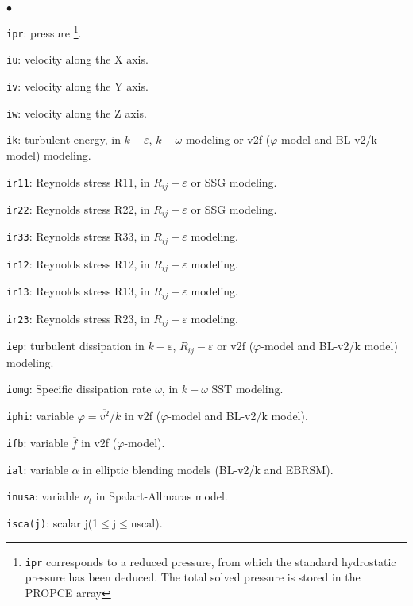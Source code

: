 {{{\begin{list}{$\bullet$}{}
\item \texttt{ipr}: pressure
\footnote{\texttt{ipr} corresponds to a
reduced pressure, from which the standard hydrostatic pressure has been
deduced. The total solved pressure is stored in the PROPCE array}.
\item \texttt{iu}: velocity along the X axis.
\item \texttt{iv}: velocity along the Y axis.
\item \texttt{iw}: velocity along the Z axis.
\item \texttt{ik}: turbulent energy, in $k-\varepsilon$,
$k-\omega$ modeling or v2f ($\varphi$-model and BL-v2/k model) modeling.
\item \texttt{ir11}: Reynolds stress R11, in
      $R_{ij}-\varepsilon$ or SSG modeling.
\item \texttt{ir22}: Reynolds stress R22, in
      $R_{ij}-\varepsilon$ or SSG modeling.
\item \texttt{ir33}: Reynolds stress R33, in
      $R_{ij}-\varepsilon$ modeling.
\item \texttt{ir12}: Reynolds stress R12, in
      $R_{ij}-\varepsilon$ modeling.
\item \texttt{ir13}: Reynolds stress R13, in
      $R_{ij}-\varepsilon$ modeling.
\item \texttt{ir23}: Reynolds stress R23, in
      $R_{ij}-\varepsilon$ modeling.
\item \texttt{iep}: turbulent dissipation in $k-\varepsilon$,
$R_{ij}-\varepsilon$ or v2f ($\varphi$-model and BL-v2/k model) modeling.
\item \texttt{iomg}: Specific dissipation rate $\omega$, in
$k-\omega$ SST modeling.
\item \texttt{iphi}: variable $\varphi=\overline{v^2}/k$ in v2f ($\varphi$-model and BL-v2/k model).
\item \texttt{ifb}: variable $\overline{f}$ in v2f ($\varphi$-model).
\item \texttt{ial}: variable $\alpha$ in elliptic blending models (BL-v2/k and EBRSM).
\item \texttt{inusa}: variable $\nu_t$ in Spalart-Allmaras model.
\item \texttt{isca(j)}: scalar j(1$\leqslant$j$\leqslant$nscal).
\end{list}

}}}
